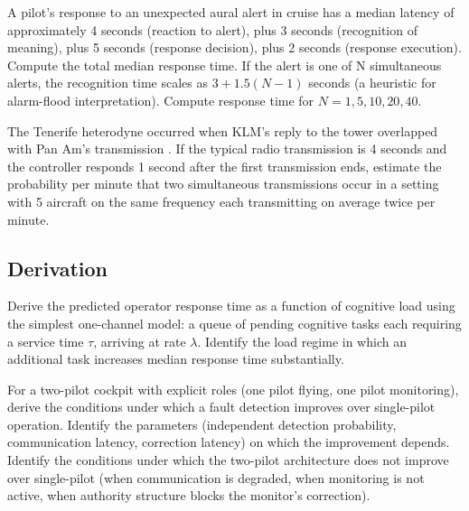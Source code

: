 \begin{exercise}
A pilot's response to an unexpected aural alert in cruise has a median latency of approximately 4 seconds (reaction to alert), plus 3 seconds (recognition of meaning), plus 5 seconds (response decision), plus 2 seconds (response execution). Compute the total median response time. If the alert is one of N simultaneous alerts, the recognition time scales as $3 + 1.5(N-1)$ seconds (a heuristic for alarm-flood interpretation). Compute response time for $N = 1, 5, 10, 20, 40$.
\end{exercise}

\begin{exercise}
The Tenerife heterodyne occurred when KLM's reply to the tower overlapped with Pan Am's transmission \cite{acc:ciaiac-tenerife-1978}. If the typical radio transmission is 4 seconds and the controller responds 1 second after the first transmission ends, estimate the probability per minute that two simultaneous transmissions occur in a setting with 5 aircraft on the same frequency each transmitting on average twice per minute.
\end{exercise}

\subsection*{Derivation}

\begin{exercise}
Derive the predicted operator response time as a function of cognitive load using the simplest one-channel model: a queue of pending cognitive tasks each requiring a service time $\tau$, arriving at rate $\lambda$. Identify the load regime in which an additional task increases median response time substantially.
\end{exercise}

\begin{exercise}
For a two-pilot cockpit with explicit roles (one pilot flying, one pilot monitoring), derive the conditions under which a fault detection improves over single-pilot operation. Identify the parameters (independent detection probability, communication latency, correction latency) on which the improvement depends. Identify the conditions under which the two-pilot architecture does not improve over single-pilot (when communication is degraded, when monitoring is not active, when authority structure blocks the monitor's correction).
\end{exercise}

